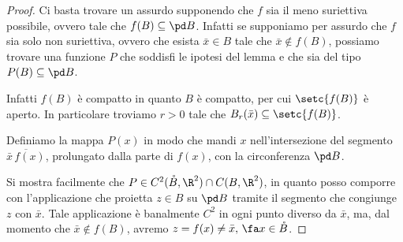 \begin{proof}
	Ci basta trovare un assurdo supponendo che \(f\) sia il meno suriettiva possibile, ovvero tale che \(f(B) \subseteq \pd B\).
	Infatti se supponiamo per assurdo che \(f\) sia solo non suriettiva, ovvero che esista \(\bar{x}\in B\) tale che \(\bar{x} \notin f(B)\), possiamo trovare una funzione \(P\) che soddisfi le ipotesi del lemma e che sia del tipo \(P(B) \subseteq \pd B\).

	Infatti \(f(B)\) è compatto in quanto \(B\) è compatto, per cui \(\setc{f(B)}\) è aperto.
	In particolare troviamo \(r>0\) tale che \(B_r(\bar{x})\subseteq \setc{f(B)}\).

	Definiamo la mappa \(P(x)\) in modo che mandi \(x\) nell'intersezione del segmento \(\overline{\bar{x}\,f(x)}\), prolungato dalla parte di \(f(x)\), con la circonferenza \(\pd B\).

	Si mostra facilmente che \(P \in C^2(\mathring{B},\R^2) \cap C(B,\R^2)\), in quanto posso comporre con l'applicazione che proietta \(z\in B\) su \(\pd B\) tramite il segmento che congiunge \(z\) con \(\bar{x}\).
	Tale applicazione è banalmente \(C^2\) in ogni punto diverso da \(\bar{x}\), ma, dal momento che \(\bar{x}\notin f(B)\), avremo \(z=f(x)\neq \bar{x},\,\fa x \in \mathring{B}\).


\end{proof}
